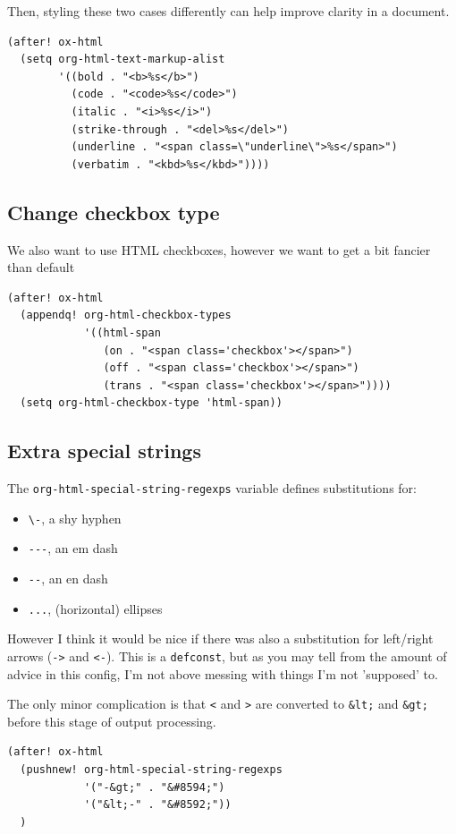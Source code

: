 \documentclass[11pt]{article}
\begin{document}
Then, styling these two cases differently can help improve clarity in a document.

\begin{verbatim}
(after! ox-html
  (setq org-html-text-markup-alist
        '((bold . "<b>%s</b>")
          (code . "<code>%s</code>")
          (italic . "<i>%s</i>")
          (strike-through . "<del>%s</del>")
          (underline . "<span class=\"underline\">%s</span>")
          (verbatim . "<kbd>%s</kbd>"))))
\end{verbatim}
\subsection{Change checkbox type}
\label{sec:org545b70e}

We also want to use HTML checkboxes, however we want to get a bit fancier than default
\begin{verbatim}
(after! ox-html
  (appendq! org-html-checkbox-types
            '((html-span
               (on . "<span class='checkbox'></span>")
               (off . "<span class='checkbox'></span>")
               (trans . "<span class='checkbox'></span>"))))
  (setq org-html-checkbox-type 'html-span))
\end{verbatim}
\subsection{Extra special strings}
\label{sec:orge96618b}

The \texttt{org-html-special-string-regexps} variable defines substitutions for:
\begin{itemize}
\item \texttt{\textbackslash{}-}, a shy hyphen
\item \texttt{-{}-{}-}, an em dash
\item \texttt{-{}-{}}, an en dash
\item \texttt{...}, (horizontal) ellipses
\end{itemize}

However I think it would be nice if there was also a substitution for left/right
arrows (\texttt{->} and \texttt{<-}). This is a \texttt{defconst}, but as you may tell from the amount of
advice in this config, I'm not above messing with things I'm not 'supposed' to.

The only minor complication is that \texttt{<} and \texttt{>} are converted to \texttt{\&lt;} and \texttt{\&gt;}
before this stage of output processing.

\begin{verbatim}
(after! ox-html
  (pushnew! org-html-special-string-regexps
            '("-&gt;" . "&#8594;")
            '("&lt;-" . "&#8592;"))
  )
\end{verbatim}
\end{document}
